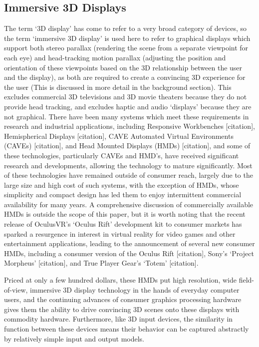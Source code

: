 \subsection{Immersive 3D Displays}
	
	The term ‘3D display’ has come to refer to a very broad category of devices, so the term ‘immersive 3D display’ is used here to refer to graphical displays which support both stereo parallax (rendering the scene from a separate viewpoint for each eye) and head-tracking motion parallax (adjusting the position and orientation of these viewpoints based on the 3D relationship between the user and the display), as both are required to create a convincing 3D experience for the user (This is discussed in more detail in the background section). This excludes commercial 3D televisions and 3D movie theaters because they do not provide head tracking, and excludes haptic and audio ‘displays’ because they are not graphical. There have been many systems which meet these requirements in research and industrial applications, including Responsive Workbenches [citation], Hemispherical Displays [citation], CAVE Automated Virtual Environments (CAVEs) [citation], and Head Mounted Displays (HMDs) [citation], and some of these technologies, particularly CAVEs and HMD’s, have received significant research and developments, allowing the technology to mature significantly. 
Most of these technologies have remained outside of consumer reach, largely due to the large size and high cost of such systems, with the exception of HMDs, whose simplicity and compact design has led them to enjoy intermittent commercial availability for many years. A comprehensive discussion of commercially available HMDs is outside the scope of this paper, but it is worth noting that the recent release of OculusVR’s ‘Oculus Rift’ development kit to consumer markets has sparked a resurgence in interest in virtual reality for video games and other entertainment applications, leading to the announcement of several new consumer HMDs, including a consumer version of the Oculus Rift [citation], Sony’s ‘Project Morpheus’ [citation], and True Player Gear’s ‘Totem’ [citation]. 

Priced at only a few hundred dollars, these HMDs put high resolution, wide field-of-view, immersive 3D display technology in the hands of everyday computer users, and the continuing advances of consumer graphics processing hardware gives them the ability to drive convincing 3D scenes onto these displays with commodity hardware. Furthermore, like 3D input devices, the similarity in function between these devices means their behavior can be captured abstractly by relatively simple input and output models. 
